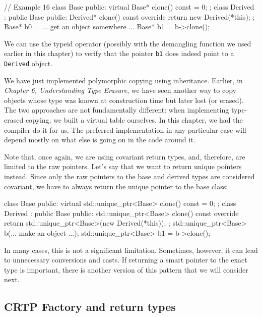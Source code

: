 \begin{code}
// Example 16
class Base {
  public:
  virtual Base* clone() const = 0;
};
class Derived : public Base {
  public:
  Derived* clone() const override {
    return new Derived(*this);
  }
};
Base* b0 = ... get an object somewhere ...
Base* b1 = b->clone();
\end{code}

We can use the typeid operator (possibly with the demangling function we used earlier in this chapter) to verify that the pointer \texttt{b1} does indeed point to a \texttt{Derived} object.

We have just implemented polymorphic copying using inheritance. Earlier, in \emph{Chapter 6, Understanding Type Erasure}, we have seen another way to copy objects whose type was known at construction time but later lost (or erased). The two approaches are not fundamentally different: when implementing type-erased copying, we built a virtual table ourselves. In this chapter, we had the compiler do it for us. The preferred implementation in any particular case will depend mostly on what else is going on in the code around it.

Note that, once again, we are using covariant return types, and, therefore, are limited to the raw pointers. Let's say that we want to return unique pointers instead. Since only the raw pointers to the base and derived types are considered covariant, we have to always return the unique pointer to the base class:

\begin{code}
class Base {
  public:
  virtual std::unique_ptr<Base> clone() const = 0;
};
class Derived : public Base {
  public:
  std::unique_ptr<Base> clone() const override {
    return std::unique_ptr<Base>(new Derived(*this));
  }
};
std::unique_ptr<Base> b(... make an object ...);
std::unique_ptr<Base> b1 = b->clone();
\end{code}

In many cases, this is not a significant limitation. Sometimes, however, it can lead to unnecessary conversions and casts. If returning a smart pointer to the exact type is important, there is another version of this pattern that we will consider next.

\subsection{CRTP Factory and return types}

